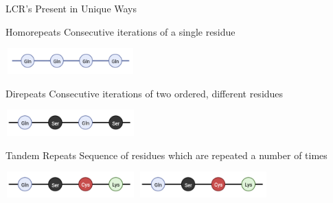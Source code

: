 \documentclass{beamer}
\begin{document}
	\begin{frame}{LCR's Present in Unique Ways }
		
		\begin{alertblock}{Homorepeats}
			Consecutive iterations of a single residue
		\end{alertblock}
	
		\begin{center}
			\includegraphics[width=5cm, height=1cm]{poyglut.png}
		\end{center}
	
		\begin{alertblock}{Direpeats}
			Consecutive iterations of two ordered, different residues
		\end{alertblock}
	
		\begin{center}
			\includegraphics[width=5cm, height=1cm]{direpeat.png}
		\end{center}

		\begin{alertblock}{Tandem Repeats}
			Sequence of residues which are repeated a number of times
		\end{alertblock}
	
		\begin{center}
			\includegraphics[width=5cm, height=1cm]{tandem.png}
			\includegraphics[width=5cm, height=1cm]{tandem.png}
		\end{center}
	
	\end{frame}
\end{document}

